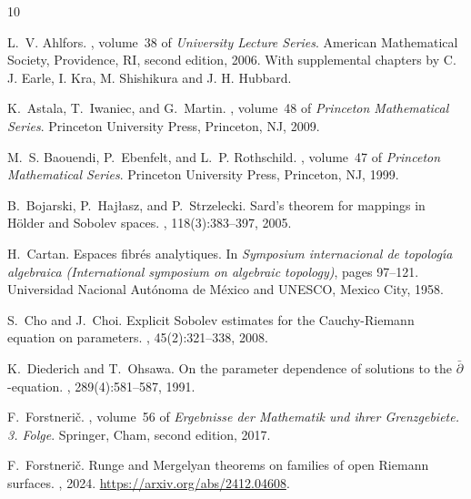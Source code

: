 \documentclass[11pt]{amsart}
\numberwithin{equation}{section}
\theoremstyle{definition}
\begin{document}
\begin{thebibliography}{10}

L.~V. Ahlfors.
, volume~38 of {\em
  University Lecture Series}.
\newblock American Mathematical Society, Providence, RI, second edition, 2006.
\newblock With supplemental chapters by C. J. Earle, I. Kra, M. Shishikura and
  J. H. Hubbard.

K.~Astala, T.~Iwaniec, and G.~Martin.
, volume~48 of {\em Princeton Mathematical Series}.
\newblock Princeton University Press, Princeton, NJ, 2009.

M.~S. Baouendi, P.~Ebenfelt, and L.~P. Rothschild.
,
  volume~47 of {\em Princeton Mathematical Series}.
\newblock Princeton University Press, Princeton, NJ, 1999.

B.~Bojarski, P.~Haj{\l}asz, and P.~Strzelecki.
\newblock Sard's theorem for mappings in {H{\"o}lder} and {Sobolev} spaces.
, 118(3):383--397, 2005.

H.~Cartan.
\newblock Espaces fibr\'es analytiques.
\newblock In {\em Symposium internacional de topolog\'\i a algebraica
  ({I}nternational symposium on algebraic topology)}, pages 97--121.
  Universidad Nacional Aut\'onoma de M\'exico and UNESCO, Mexico City, 1958.

S.~Cho and J.~Choi.
\newblock Explicit {Sobolev} estimates for the {Cauchy}-{Riemann} 
equation on parameters.
, 45(2):321--338, 2008.

K.~Diederich and T.~Ohsawa.
\newblock On the parameter dependence of solutions to the
  {{\(\bar\partial\)}}-equation.
, 289(4):581--587, 1991.

F.~Forstneri\v{c}.
, volume~56 of {\em Ergebnisse der Mathematik und ihrer
  Grenzgebiete. 3. Folge}.
\newblock Springer, Cham, second edition, 2017.

F.~Forstneri\v{c}.
\newblock Runge and {M}ergelyan theorems on families of open {R}iemann
  surfaces.
, 2024.
\newblock \url{https://arxiv.org/abs/2412.04608}.


\end{thebibliography}
\end{document}

